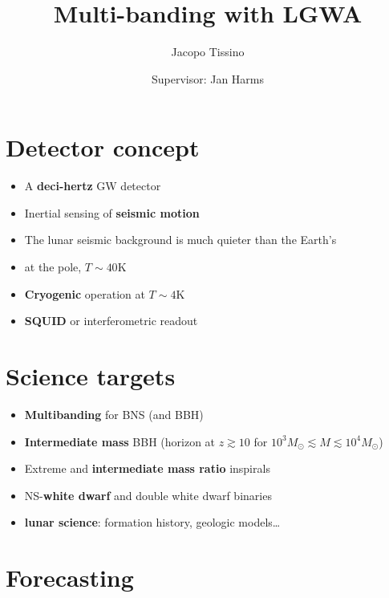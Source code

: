 \documentclass[a0paper,fleqn]{betterposter}
\begin{document}
{\title{Multi-banding with LGWA}
\author{Jacopo Tissino}
\author{Supervisor: Jan Harms}
\vspace{5mm}

\vspace{10mm}
\section{Detector concept}
\vspace{-1cm}

\begin{itemize}
    \item A \textbf{deci-hertz} GW detector
    \item Inertial sensing of \textbf{seismic motion}
    \item The lunar seismic background is much quieter than the Earth's
    \item {} at the pole, $T\sim 40 \text{K}$
    \item \textbf{Cryogenic} operation at $T\sim 4 \text{K}$
    \item \textbf{SQUID} or interferometric readout
\end{itemize}

\vspace{20mm}
\section{Science targets}
\vspace{-1cm}

\begin{itemize}
    \item \textbf{Multibanding} for BNS (and BBH)
    \item \textbf{Intermediate mass} BBH (horizon at \(z \gtrsim 10\) for $10^3 M_{\odot} \lesssim M \lesssim 10^4 M_{\odot}$)
    \item Extreme and \textbf{intermediate mass ratio} inspirals
    \item NS-\textbf{white dwarf} and double white dwarf binaries
    \item \textbf{lunar science}: formation history, geologic models\dots
\end{itemize}

\vspace{20mm}
\section{Forecasting}
\vspace{-1cm}

}
\end{document}
